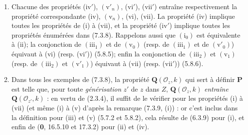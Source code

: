 \begin{remarks}[7.3.9]
\label{IV.2.s7.3.9-fr}
\begin{enumerate}
\item[(i)] Chacune des propriétés (iv$'$), $(\mathrm v'_n)$, (vi$'$),
(vii$'$) entraîne respectivement la propriété correspondante (iv),
$(\mathrm v_n)$, (vi), (vii). La propriété (iv) implique toutes les
propriétés de (i) à (vii), et la propriété (iv$'$) implique toutes les
propriétés énumérées dans (7.3.8). Rappelons aussi que $(\mathrm i_0)$ est
équivalente à (ii); la conjonction de $(\mathrm{iii}_1)$ et de
$(\mathrm v_0)$ (resp. de $(\mathrm{iii}_1)$ et de
$(\mathrm v'_0)$) équivaut à (vi) (resp. (vi$'$)) (5.8.5); enfin la
conjonction de $(\mathrm{iii}_2)$ et $(\mathrm v_1)$ (resp. de
$(\mathrm{iii}_2)$ et $(\mathrm v'_1)$) équivaut à (vii) (resp.
(vii$'$)) (5.8.6).
\item[(ii)] Dans tous les exemples de (7.3.8), la propriété
$\boldsymbol Q(\mathscr O_z,k)$ qui sert à définir $\boldsymbol P$ est
telle que, pour toute \emph{générisation} $z'$ de $z$ dans $Z$,
$\boldsymbol Q(\mathscr O_z,k)$ \emph{entraîne}
$\boldsymbol Q(\mathscr O_{z'},k)$ : en vertu de (2.3.4), il suffit de le
vérifier pour les propriétés (i) à (vii) (et même (i) à (v) d'après la
remarque (7.3.9, (i)) : or c'est inclus dans la définition pour (iii) et
(v) (5.7.2 et 5.8.2), cela résulte de (6.3.9) pour (i), et enfin de
(\textbf{0}, 16.5.10 et 17.3.2) pour (ii) et (iv).
\end{enumerate}
\end{remarks}


